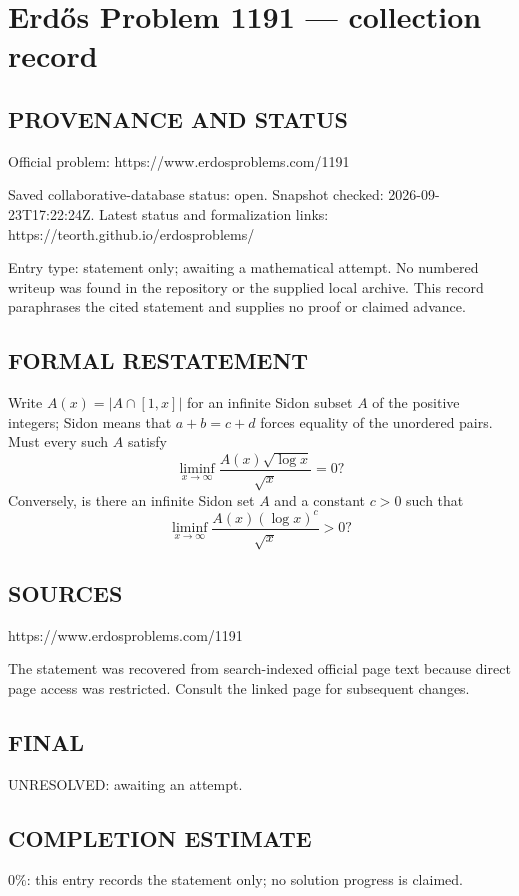 \section*{Erd\H{o}s Problem 1191 --- collection record}

\subsection*{PROVENANCE AND STATUS}
Official problem: https://www.erdosproblems.com/1191

Saved collaborative-database status: open.
Snapshot checked: 2026-09-23T17:22:24Z.
Latest status and formalization links: https://teorth.github.io/erdosproblems/

Entry type: statement only; awaiting a mathematical attempt. No numbered writeup was found in the repository or the supplied local archive. This record paraphrases the cited statement and supplies no proof or claimed advance.

\subsection*{FORMAL RESTATEMENT}
Write $A(x)=|A\cap[1,x]|$ for an infinite Sidon subset $A$ of the positive integers; Sidon means that $a+b=c+d$ forces equality of the unordered pairs. Must every such $A$ satisfy
\[\liminf_{x\to\infty}\frac{A(x)\sqrt{\log x}}{\sqrt x}=0?\]
Conversely, is there an infinite Sidon set $A$ and a constant $c>0$ such that
\[\liminf_{x\to\infty}\frac{A(x)(\log x)^c}{\sqrt x}>0?\]

\subsection*{SOURCES}
https://www.erdosproblems.com/1191

The statement was recovered from search-indexed official page text because direct page access was restricted. Consult the linked page for subsequent changes.

\subsection*{FINAL}
UNRESOLVED: awaiting an attempt.

\subsection*{COMPLETION ESTIMATE}
$0\%$: this entry records the statement only; no solution progress is claimed.
